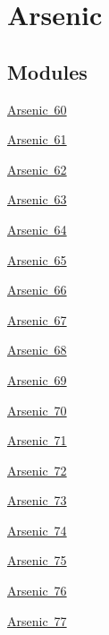 \hypertarget{group___isotope_const-_arsenic}{}\section{Arsenic}
\label{group___isotope_const-_arsenic}
\subsection*{Modules}
\begin{DoxyCompactItemize}
\item 
\mbox{\hyperlink{group___isotope_const-_arsenic-_as60}{Arsenic 60}}
\item 
\mbox{\hyperlink{group___isotope_const-_arsenic-_as61}{Arsenic 61}}
\item 
\mbox{\hyperlink{group___isotope_const-_arsenic-_as62}{Arsenic 62}}
\item 
\mbox{\hyperlink{group___isotope_const-_arsenic-_as63}{Arsenic 63}}
\item 
\mbox{\hyperlink{group___isotope_const-_arsenic-_as64}{Arsenic 64}}
\item 
\mbox{\hyperlink{group___isotope_const-_arsenic-_as65}{Arsenic 65}}
\item 
\mbox{\hyperlink{group___isotope_const-_arsenic-_as66}{Arsenic 66}}
\item 
\mbox{\hyperlink{group___isotope_const-_arsenic-_as67}{Arsenic 67}}
\item 
\mbox{\hyperlink{group___isotope_const-_arsenic-_as68}{Arsenic 68}}
\item 
\mbox{\hyperlink{group___isotope_const-_arsenic-_as69}{Arsenic 69}}
\item 
\mbox{\hyperlink{group___isotope_const-_arsenic-_as70}{Arsenic 70}}
\item 
\mbox{\hyperlink{group___isotope_const-_arsenic-_as71}{Arsenic 71}}
\item 
\mbox{\hyperlink{group___isotope_const-_arsenic-_as72}{Arsenic 72}}
\item 
\mbox{\hyperlink{group___isotope_const-_arsenic-_as73}{Arsenic 73}}
\item 
\mbox{\hyperlink{group___isotope_const-_arsenic-_as74}{Arsenic 74}}
\item 
\mbox{\hyperlink{group___isotope_const-_arsenic-_as75}{Arsenic 75}}
\item 
\mbox{\hyperlink{group___isotope_const-_arsenic-_as76}{Arsenic 76}}
\item 
\mbox{\hyperlink{group___isotope_const-_arsenic-_as77}{Arsenic 77}}

\end{DoxyCompactItemize}
